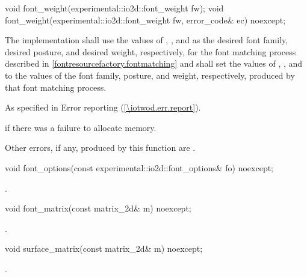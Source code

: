 \begin{itemdecl}
void font_weight(experimental::io2d::font_weight fw);
void font_weight(experimental::io2d::font_weight fw,
  error_code& ec) noexcept;
\end{itemdecl}
\begin{itemdescr}
\pnum
\effects
The implementation shall use the values of , , and  as the desired font family, desired posture, and desired weight, respectively, for the font matching process described in \ref{fontresourcefactory.fontmatching} and shall set the values of , , and  to the values of the font family, posture, and weight, respectively, produced by that font matching process.

\pnum
\throws
As specified in Error reporting (\ref{\iotwod.err.report}).

\pnum
\errors
{} if there was a failure to allocate memory.

\pnum
Other errors, if any, produced by this function are .
\end{itemdescr}

\begin{itemdecl}
void font_options(const experimental::io2d::font_options& fo) noexcept;
\end{itemdecl}
\begin{itemdescr}
\pnum
\effects
{}.
\end{itemdescr}

\begin{itemdecl}
void font_matrix(const matrix_2d& m) noexcept;
\end{itemdecl}
\begin{itemdescr}
\pnum
\effects
{}.
\end{itemdescr}

\begin{itemdecl}
void surface_matrix(const matrix_2d& m) noexcept;
\end{itemdecl}
\begin{itemdescr}
\pnum
\effects
{}.
\end{itemdescr}

